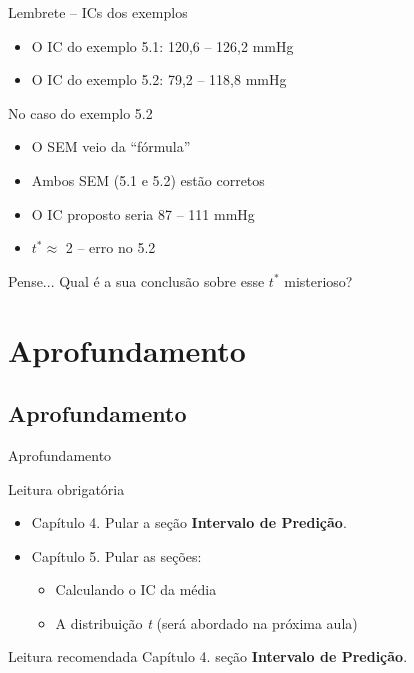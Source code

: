 \documentclass{beamer}
\begin{document}
\begin{frame}{\scriptsize }
  \begin{exampleblock}{Lembrete -- ICs dos exemplos}
    \footnotesize
    \begin{itemize}
    \item O IC do exemplo 5.1: 120,6 -- 126,2 mmHg
    \item O IC do exemplo 5.2: \alert{79,2 -- 118,8 mmHg}
    \end{itemize}
  \end{exampleblock}
  \begin{block}{No caso do exemplo 5.2}
    \footnotesize
    \begin{itemize}
    \item O SEM veio da ``fórmula''
    \item Ambos SEM (5.1 e 5.2) estão corretos
    \item O IC proposto seria \alert{87 -- 111 mmHg}
    \item $t^{*} \approx$ 2 -- erro no 5.2
    \end{itemize}
  \end{block}
  \begin{block}{Pense...}
    \footnotesize
    Qual é a sua conclusão sobre esse $t^{*}$ misterioso?
  \end{block}
\end{frame}

\section{Aprofundamento}

\subsection{Aprofundamento}

\begin{frame}{\scriptsize Aprofundamento}
  \begin{block}{Leitura obrigatória}
    \begin{itemize}
      \footnotesize
    \item Capítulo 4. Pular a seção {\bf Intervalo de Predição}.
    \item Capítulo 5. Pular as seções:
      \begin{itemize}
        \scriptsize
      \item Calculando o IC da média
      \item A distribuição {\em t} ({\tiny será abordado na próxima aula})
      \end{itemize}
    \end{itemize}
  \end{block}
  \begin{block}{Leitura recomendada}
    \scriptsize
    Capítulo 4. seção {\bf Intervalo de Predição}.
  \end{block}
\end{frame}
\end{document}
